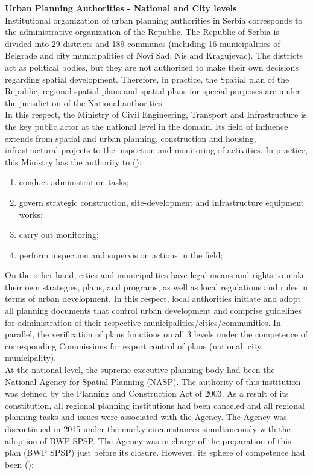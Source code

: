 \documentclass[11pt]{report}
\begin{document}
\textbf{Urban Planning Authorities - National and City levels}
\\
Institutional organization of urban planning authorities in Serbia corresponds to the administrative organization of the Republic.
The Republic of Serbia is divided into 29 districts and 189 communes (including 16 municipalities of Belgrade and city municipalities of Novi Sad, Nis and Kragujevac).
The districts act as political bodies, but they are not authorized to make their own decisions regarding spatial development.
Therefore, in practice, the Spatial plan of the Republic, regional spatial plans and spatial plans for special purposes are under the jurisdiction of the National authorities.
\\
In this respect, the Ministry of Civil Engineering, Transport and Infrastructure is the key public actor at the national level in the domain.
Its field of influence extends from spatial and urban planning, construction and housing, infrastructural projects to the inspection and monitoring of activities.
In practice, this Ministry has the authority to (\cite{(Maksic 2012)}):

\begin{enumerate}
\item conduct administration tasks;
\item govern strategic construction, site-development and infrastructure equipment works;
\item carry out monitoring;
\item perform inspection and supervision actions in the field;
\end{enumerate} 

On the other hand, cities and municipalities have legal means and rights to make their own strategies, plans, and programs, as well as local regulations and rules in terms of urban development.
In this respect, local authorities initiate and adopt all planning documents that control urban development and comprise guidelines for administration of their respective municipalities/cities/communities. In parallel, the verification of plans functions on all 3 levels under the competence of corresponding Commissions for expert control of plans (national, city, municipality).
\\
At the national level, the supreme executive planning body had been the National Agency for Spatial Planning (NASP). The authority of this institution was defined by the Planning and Construction Act of 2003.
As a result of its constitution, all regional planning institutions had been canceled and all regional planning tasks and issues were associated with the Agency. 
The Agency was discontinued in 2015 under the murky circumstances simultaneously with the adoption of BWP SPSP. The Agency was in charge of the preparation of this plan (BWP SPSP) just before its closure.
However, its sphere of competence had been (\cite{Maksic 2012}):
\end{document}

